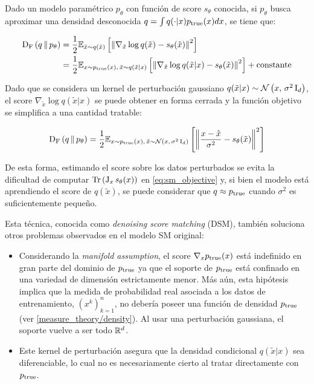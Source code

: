 \begin{prop}
    Dado un modelo paramétrico $p_\theta$ con función de score $s_\theta$ conocida, si $p_\theta$ busca aproximar una densidad desconocida $q=\int q(\cdot|x)p_{\operatorname{true}}(x)dx$, se tiene que:

    \begin{align*}
        \operatorname{D_F}\left(q\,\|\,p_\theta\right) & = \frac{1}{2}\mathbb{E}_{\tilde{x}\sim q(\tilde{x})}\left[\left\lVert \nabla_{\tilde{x}}\log q(\tilde{x}) - s_\theta(\tilde{x}) \right\rVert^2\right]                             \\
                         & = \frac{1}{2}\mathbb{E}_{x\sim p_{\operatorname{true}}(x),\,\tilde{x}\sim q(\tilde{x}|x)}\left[\left\lVert \nabla_{\tilde{x}}\log q(\tilde{x}|x) - s_\theta(\tilde{x}) \right\rVert^2\right] + \operatorname{constante}
    \end{align*}
\end{prop}

Dado que se considera un kernel de perturbación gaussiano $q(\tilde{x}|x) \sim \mathcal{N}\left(x,\,\sigma^2 \operatorname{I}_{d}\right)$, el score $\nabla_{\tilde{x}}\log q(\tilde{x}|x)$ se puede obtener en forma cerrada y la función objetivo se simplifica a una cantidad tratable:

\begin{equation}
    \label{eq:fisher_dsm}
    \operatorname{D_F}\left(q\,\|\,p_\theta\right) = \frac{1}{2}\mathbb{E}_{x\sim p_{\operatorname{true}}(x),\,\tilde{x}\sim \mathcal{N}\left(x,\,\sigma^2 \operatorname{I}_{d}\right)}\left[\left\lVert \frac{x-\tilde{x}}{\sigma^2} - s_\theta(\tilde{x}) \right\rVert^2\right]
\end{equation}

De esta forma, estimando el score sobre los datos perturbados se evita la dificultad de computar $\operatorname{Tr}\left(\operatorname{J}_x s_\theta(x)\right)$ en \eqref{eq:sm_objective} y, si bien el modelo está aprendiendo el score de $q(\tilde{x})$, se puede considerar que $q\approx p_{\operatorname{true}}$ cuando $\sigma^2$ es suficientemente pequeño.

Esta técnica, conocida como \textit{denoising score matching} (DSM), también soluciona otros problemas observados en el modelo SM original:

\begin{itemize}
    \item Considerando la \textit{manifold assumption}, el score $\nabla_x p_{\operatorname{true}}(x)$ está indefinido en gran parte del dominio de $p_{\operatorname{true}}$ ya que el soporte de $p_{\operatorname{true}}$ está confinado en una variedad de dimensión estrictamente menor. Más aún, esta hipótesis implica que la medida de probabilidad real asociada a los datos de entrenamiento, $(x^k)_{k=1}^n$, no debería poseer una función de densidad $p_{\operatorname{true}}$ (ver \autoref{measure_theory/density}). Al usar una perturbación gaussiana, el soporte vuelve a ser todo $\mathbb{R}^d$.
    \item Este kernel de perturbación asegura que la densidad condicional $q(\tilde{x}|x)$ sea diferenciable, lo cual no es necesariamente cierto al tratar directamente con $p_{\operatorname{true}}$.
\end{itemize}

